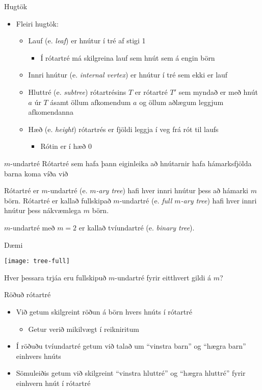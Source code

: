 \documentclass[handout]{beamer}
\begin{document}
\begin{frame}{Hugtök}
\begin{itemize}
 \item Fleiri hugtök:
 \begin{itemize}
  \item Lauf (e. \emph{leaf}) er hnútur í tré af stigi 1
  \begin{itemize}
   \item Í rótartré má skilgreina lauf sem hnút sem á engin börn
  \end{itemize}
  \item Innri hnútur (e. \emph{internal vertex}) er hnútur í tré sem ekki er lauf
  \item Hluttré (e. \emph{subtree}) rótartrésins $T$ er rótartré $T'$ sem myndað er með hnút $a$ úr $T$ ásamt öllum afkomendum $a$ og öllum aðlægum leggjum afkomendanna
  \item Hæð (e. \emph{height}) rótartrés er fjöldi leggja í veg frá rót til laufs
  \begin{itemize}
   \item Rótin er í hæð 0
  \end{itemize}
 \end{itemize}
\end{itemize}
\end{frame}


\begin{frame}{$m$-undartré}
Rótartré sem hafa þann eiginleika að hnútarnir hafa hámarksfjölda barna koma víða við
\begin{tcolorbox}[title=$m$-undartré]
Rótartré er $m$-undartré (e. \emph{$m$-ary tree}) hafi hver innri hnútur þess að hámarki $m$ börn. Rótartré er kallað fullskipað $m$-undartré (e. \emph{full $m$-ary tree}) hafi hver innri hnútur þess nákvæmlega $m$ börn.
\end{tcolorbox}

$m$-undartré með $m = 2$ er kallað tvíundartré (e. \emph{binary tree}).
\end{frame}

\begin{frame}{Dæmi}
\begin{center}
\texttt{[image: tree-full]}
\end{center}
Hver þessara trjáa eru fullskipuð $m$-undartré fyrir eitthvert gildi á $m$?
\end{frame}

\begin{frame}{Röðuð rótartré}
\begin{itemize}
 \item Við getum skilgreint röðun á börn hvers hnúts í rótartré
 \begin{itemize}
  \item Getur verið mikilvægt í reikniritum
 \end{itemize}
 \item Í röðuðu tvíundartré getum við talað um ``vinstra barn'' og ``hægra barn'' einhvers hnúts
 \item Sömuleiðis getum við skilgreint ``vinstra hluttré'' og ``hægra hluttré'' fyrir einhvern hnút í rótartré
\end{itemize}
\end{frame}
\end{document}
